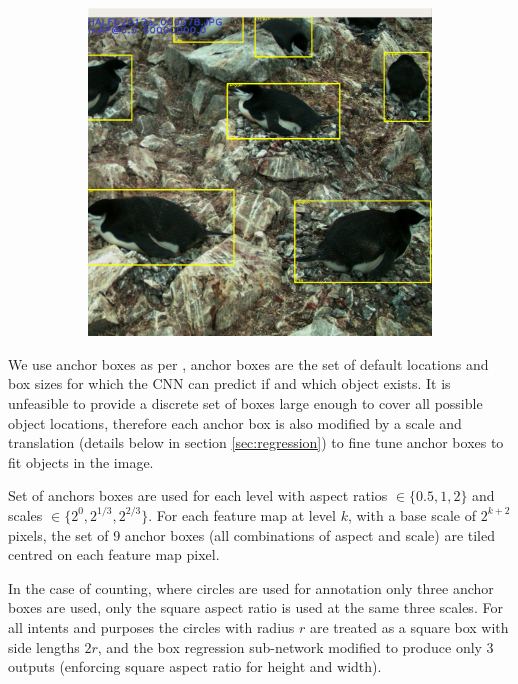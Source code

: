 \begin{figure}
\begin{subfigure}[t]{0.33\textwidth}
  \caption{}
  \end{subfigure}%
  \begin{subfigure}[t]{0.35\textwidth}
  \includegraphics[width=0.95\linewidth]{figures/object/final.png}
  \caption{}
  \end{subfigure}%
  \label{fig:anchor_boxes}
\end{figure}


We use anchor boxes as per \cite{Wang2017}, anchor boxes are the set of default locations and box sizes for which the \gls{CNN} can predict if and which object exists. It is unfeasible to provide a discrete set of boxes large enough to cover all possible object locations, therefore each anchor box is also modified by a scale and translation (details below in section \ref{sec:regression}) to fine tune anchor boxes to fit objects in the image.

Set of anchors boxes are used for each level with aspect ratios $ \in \{0.5, 1, 2\} $ and scales $ \in \{2^0, 2^{1/3}, 2^{2/3}\} $. For each feature map at level $k$, with a base scale of $ 2^{k + 2} $ pixels, the set of 9 anchor boxes (all combinations of aspect and scale) are tiled centred on each feature map pixel. 

In the case of counting, where circles are used for annotation only three anchor boxes are used, only the square aspect ratio is used at the same three scales. For all intents and purposes the circles with radius $r$ are treated as a square box with side lengths $2r$, and the box regression sub-network modified to produce only $3$ outputs (enforcing square aspect ratio for height and width).

